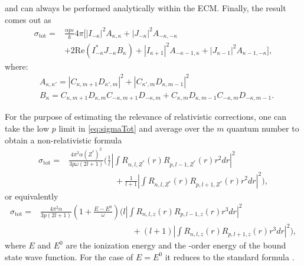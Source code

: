   and can always be performed analytically within the ECM. Finally, the result comes out as
  \begin{align}\label{eq:sigmaTot}
    \sigma_{\mathrm{tot}} =& \frac{\alpha p \varepsilon}{k} 4\pi
    \Big[\left|I_{-\kappa}\right|^2 A_{\kappa,\kappa} +
    \left|J_{-\kappa}\right|^2 A_{-\kappa,-\kappa} \nonumber
    \\
    &+2\text{Re}(I_{-\kappa}^* J_{-\kappa}B_\kappa) +
    \left|I_{\kappa+1}\right|^2 A_{-\kappa-1,\kappa} +
    \left|J_{\kappa-1} \right|^2A_{\kappa-1,-\kappa}\Big],
  \end{align}
  where:
  \begin{align}
    &A_{\kappa,\kappa'} = \left|C_{\kappa,m+1}D_{\kappa',m}\right|^2
      + \left|C_{\kappa',m} D_{\kappa,m-1}\right|^2 
    \\
    &B_\kappa = C_{\kappa,m+1} D_{\kappa,m} C_{-\kappa,m+1}
      D_{-\kappa,m} + C_{\kappa,m} D_{\kappa,m-1} C_{-\kappa,m}
      D_{-\kappa,m-1}.
  \end{align}
  
  For the purpose of estimating the relevance of relativistic
  corrections, one can take the low $p$ limit in \eqref{eq:sigmaTot} and
  average over the $m$ quantum number to obtain a non-relativistic
  formula
  \begin{align}
    \sigma_{\mathrm{tot}}=&\frac{4\pi^2 \alpha (Z^*)^2}{3 p \omega
      (2l+1)} \Bigg(\frac{1}{l}\left|\int R_{n,l,Z^*}(r)R_{p,l-1,Z^*}(r)
        r^2dr\right|^2 \\
        &\mspace{100mu}+ \frac{1}{l+1}\left| \int R_{n,l,Z^*}(r)
        R_{p,l+1,Z^*}(r)r^2dr\right|^2\Bigg),
  \end{align}
  or equivalently
  \begin{align}
    \sigma_{\mathrm{tot}}=&\frac{4\pi^2 \alpha}{3 p (2l+1)}
    \left(1+\frac{E-E^0}{\omega}\right)\Bigg(l \left|\int
        R_{n,l,z}(r) R_{p,l-1,z}(r)r^3dr\right|^2 \\
        &\mspace{200mu}+ (l+1) \left|\int
        R_{n,l,z}(r) R_{p,l+1,z}(r)r^3dr\right|^2\Bigg),
  \end{align}
  where $E$ and $E^0$ are the ionization energy and the -order
  energy of the bound state wave function. For the case of $E=E^0$ it
  reduces to the standard formula \cite{YEH19851}.